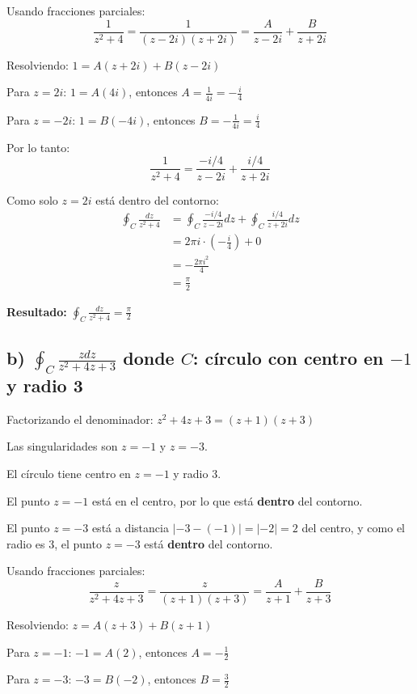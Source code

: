 \documentclass{article}
\begin{document}
Usando fracciones parciales:
$$\frac{1}{z^2 + 4} = \frac{1}{(z - 2i)(z + 2i)} = \frac{A}{z - 2i} + \frac{B}{z + 2i}$$

Resolviendo: $1 = A(z + 2i) + B(z - 2i)$

Para $z = 2i$: $1 = A(4i)$, entonces $A = \frac{1}{4i} = -\frac{i}{4}$

Para $z = -2i$: $1 = B(-4i)$, entonces $B = -\frac{1}{4i} = \frac{i}{4}$

Por lo tanto:
$$\frac{1}{z^2 + 4} = \frac{-i/4}{z - 2i} + \frac{i/4}{z + 2i}$$

Como solo $z = 2i$ está dentro del contorno:
\begin{align*}
\oint_C \frac{dz}{z^2 + 4} &= \oint_C \frac{-i/4}{z - 2i} dz + \oint_C \frac{i/4}{z + 2i} dz \\
                            &= 2\pi i \cdot \left(-\frac{i}{4}\right) + 0 \\
                            &= -\frac{2\pi i^2}{4} \\
                            &= \frac{\pi}{2}
\end{align*}

\textbf{Resultado:} $\oint_C \frac{dz}{z^2 + 4} = \frac{\pi}{2}$

\subsection*{b) $\oint_C \frac{z dz}{z^2 + 4z + 3}$ donde $C$: círculo con centro en $-1$ y radio 3}

Factorizando el denominador: $z^2 + 4z + 3 = (z + 1)(z + 3)$

Las singularidades son $z = -1$ y $z = -3$.

El círculo tiene centro en $z = -1$ y radio 3.

El punto $z = -1$ está en el centro, por lo que está \textbf{dentro} del contorno.

El punto $z = -3$ está a distancia $|-3 - (-1)| = |-2| = 2$ del centro, y como el radio es 3, el punto $z = -3$ está \textbf{dentro} del contorno.

Usando fracciones parciales:
$$\frac{z}{z^2 + 4z + 3} = \frac{z}{(z + 1)(z + 3)} = \frac{A}{z + 1} + \frac{B}{z + 3}$$

Resolviendo: $z = A(z + 3) + B(z + 1)$

Para $z = -1$: $-1 = A(2)$, entonces $A = -\frac{1}{2}$

Para $z = -3$: $-3 = B(-2)$, entonces $B = \frac{3}{2}$
\end{document}
